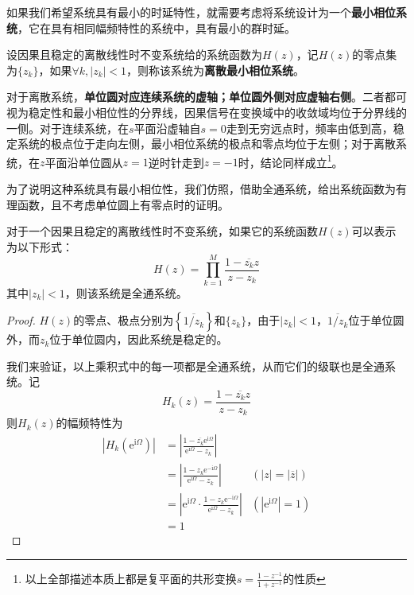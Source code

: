 如果我们希望系统具有最小的时延特性，就需要考虑将系统设计为一个\textbf{最小相位系统}，它在具有相同幅频特性的系统中，具有最小的群时延。
\begin{definition}[离散最小相位系统]
    设因果且稳定的离散线性时不变系统给的系统函数为$H(z)$，记$H(z)$的零点集为$\{z_k\}$，如果$\forall k,|z_k|<1$，则称该系统为\textbf{离散最小相位系统}。
\end{definition} 

对于离散系统，\textbf{单位圆对应连续系统的虚轴；单位圆外侧对应虚轴右侧}。二者都可视为稳定性和最小相位性的分界线，因果信号在变换域中的收敛域均位于分界线的一侧。对于连续系统，在$s$平面沿虚轴自$s=0$走到无穷远点时，频率由低到高，稳定系统的极点位于走向左侧，最小相位系统的极点和零点均位于左侧；对于离散系统，在$z$平面沿单位圆从$z=1$逆时针走到$z=-1$时，结论同样成立\footnote{以上全部描述本质上都是复平面的共形变换$s=\frac{1-z^{-1}}{1+z^{-1}}$的性质}。

为了说明这种系统具有最小相位性，我们仿照，借助全通系统，给出系统函数为有理函数，且不考虑单位圆上有零点时的证明。

\begin{lemma}[离散全通系统]
    对于一个因果且稳定的离散线性时不变系统，如果它的系统函数$H(z)$可以表示为以下形式：
    $$H(z)=\prod_{k=1}^{M}\frac{1-\overline{z_k}z}{z-z_k}$$
    其中$|z_k|<1$，则该系统是全通系统。
\end{lemma}
\begin{proof}
    $H(z)$的零点、极点分别为$\left\{\overline{1/z_k}\right\}$和$\{z_k\}$，由于$|z_k|<1$，$\overline{1/z_k}$位于单位圆外，而$z_k$位于单位圆内，因此系统是稳定的。

    我们来验证，以上乘积式中的每一项都是全通系统，从而它们的级联也是全通系统。记
    $$H_k(z)=\frac{1-\overline{z_k}z}{z-z_k}$$
    则$H_k(z)$的幅频特性为\begin{align*}
        |H_k(\mathrm{e}^{\mathrm{i}\Omega})|&=\left|\frac{1-\overline{z_k}\mathrm{e}^{\mathrm{i}\Omega}}{\mathrm{e}^{\mathrm{i}\Omega}-z_k}\right|\\
        &=\left|\frac{1-z_k \mathrm{e}^{-\mathrm{i}\Omega}}{\mathrm{e}^{\mathrm{i}\Omega}-z_k}\right|&(|z|=|\overline{z}|)\\
        &=\left|\mathrm{e}^{\mathrm{i}\Omega}\cdot\frac{1-z_k \mathrm{e}^{-\mathrm{i}\Omega}}{\mathrm{e}^{\mathrm{i}\Omega}-z_k}\right|&(|\mathrm{e}^{\mathrm{i}\Omega}|=1)\\
        &=1
    \end{align*}
\end{proof}

